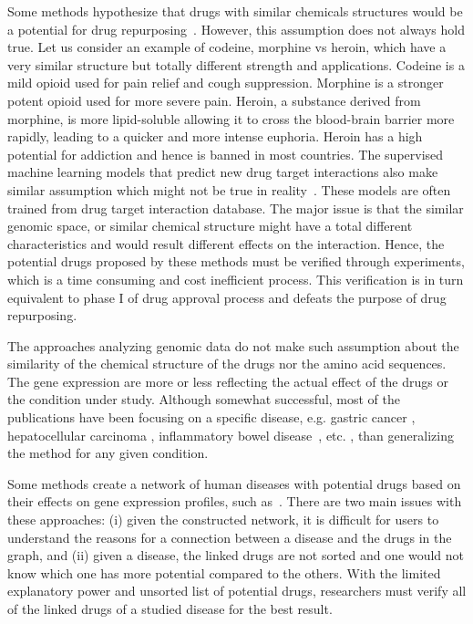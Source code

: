\documentclass[Minh_PhD_thesis.tex]{subfiles}
\begin{document}
Some methods hypothesize that drugs with similar chemicals structures would be a potential for drug repurposing~\cite{bleakley2009supervised, li2012new, tan2014drug}. However, this assumption does not always hold true. Let us consider an example of codeine, morphine vs heroin, which have a very similar structure but totally different strength and applications. Codeine is a mild opioid used for pain relief and cough suppression. Morphine is a stronger potent opioid used for more severe pain. Heroin, a substance derived from morphine, is more lipid-soluble allowing it to cross the blood-brain barrier more rapidly, leading to a quicker and more intense euphoria. Heroin has a high potential for addiction and hence is banned in most countries. 
The supervised machine learning models that predict new drug target interactions also make similar assumption which might not be true in reality~\cite{zheng2015large, susnow2003use, shen2003development, duvenaud2015convolutional, salt1992use}. These models are often trained from drug target interaction database. The major issue is that the similar genomic space, or similar chemical structure might have a total different characteristics and would result different effects on the interaction.
Hence, the potential drugs  proposed by these methods  must be verified through experiments, which is a time consuming and cost inefficient process. This verification is in turn equivalent to phase I of drug approval process and defeats the purpose of drug repurposing.

The approaches analyzing genomic data do not make such assumption about the similarity of the chemical structure of the drugs nor the amino acid sequences. The gene expression are more or less reflecting the actual effect of the drugs or the condition under study.
Although somewhat successful, most of the publications have been focusing on a specific disease, e.g. gastric cancer \cite{claerhout2011gene}, hepatocellular carcinoma \cite{chen2011gene},  inflammatory bowel disease~\cite{dudley2011computational}, etc. , than generalizing the method for any given condition.

Some methods create a network of human diseases with potential drugs based on their effects on gene expression profiles, such as~\cite{hu2009human, iorio2010identification, iorio2010discovery}. There are two main issues with these approaches: (i) given the constructed network, it is difficult for users to understand the reasons for a connection between a disease and the drugs in the graph, and (ii) given a disease, the linked drugs are not sorted and one would not know which one has more potential compared to the others. With the limited explanatory power and unsorted list of potential drugs, researchers must verify all of the linked drugs of a studied disease for the best result. 
\end{document}
